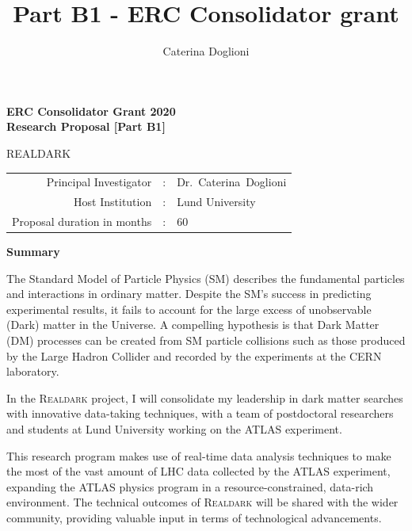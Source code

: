 \documentclass[11pt,a4paper]{article}
\title{{\Large Part B1 - ERC Consolidator grant}}
\author{{\normalsize Caterina Doglioni}}
\date{}                                           %
\begin{document}
\begin{center} 

{\Large\bf ERC Consolidator Grant 2020} \\
	{\Large\bf Research Proposal [Part B1]}  \\
 
\vspace{2cm} 
{\huge {\bf }}   \smallskip  

\vspace{2cm} 
{\Huge{REALDARK}} \\ 
\vspace{1cm} 
\vspace{1cm}
\end{center} 
\begin{tabular}{rcl}
Principal Investigator & : & Dr.~Caterina~Doglioni \\
Host Institution & : & Lund University \\ 
Proposal duration in months & : & 60 \\
\end{tabular}  
\vspace{2cm}


\begin{center} {\bf Summary}  \end{center}

The Standard Model of Particle Physics (SM) describes the fundamental particles and interactions in ordinary matter. Despite the SM's success in predicting experimental results, it fails to account for the large excess of unobservable (Dark) matter in the Universe. A compelling hypothesis is that Dark Matter (DM) processes can be created from SM particle collisions such as those produced by the Large Hadron Collider and recorded by the experiments at the CERN laboratory. 

In the \textsc{Realdark} project, I will consolidate my leadership in dark matter searches with innovative data-taking techniques, with a team of postdoctoral researchers and students at Lund University working on the ATLAS experiment. 

This research program makes use of real-time data analysis techniques to make the most of the vast amount of LHC data collected by the ATLAS experiment, 
expanding the ATLAS physics program in a resource-constrained, data-rich environment. 
The technical outcomes of \textsc{Realdark} will be shared with the wider community, providing valuable input in terms of technological advancements. 
\end{document}
